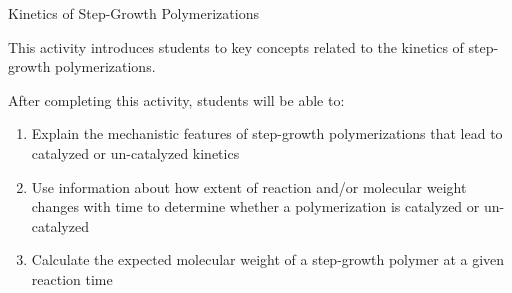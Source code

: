 %
%
%
%

\renewcommand{\figpath}{content/polymchem/stepgrowth/kinetics/figs}
\renewcommand{\labelbase}{step-kinetics}

\begin{activity}{Kinetics of Step-Growth Polymerizations}

\begin{instructornotes}

	This activity introduces students to key concepts related to the kinetics of step-growth polymerizations.
	
	After completing this activity, students will be able to:
			\begin{enumerate}
				\item Explain the mechanistic features of step-growth polymerizations that lead to catalyzed or un-catalyzed kinetics
				\item Use information about how extent of reaction and/or molecular weight changes with time to determine whether a polymerization is catalyzed or un-catalyzed
				\item Calculate the expected molecular weight of a step-growth polymer at a given reaction time
			\end{enumerate}
	
			

\end{instructornotes}
\end{activity}
